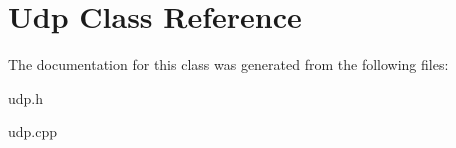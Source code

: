 \hypertarget{classUdp}{}\section{Udp Class Reference}
\label{classUdp}


The documentation for this class was generated from the following files\+:\begin{DoxyCompactItemize}
\item 
udp.\+h\item 
udp.\+cpp\end{DoxyCompactItemize}
